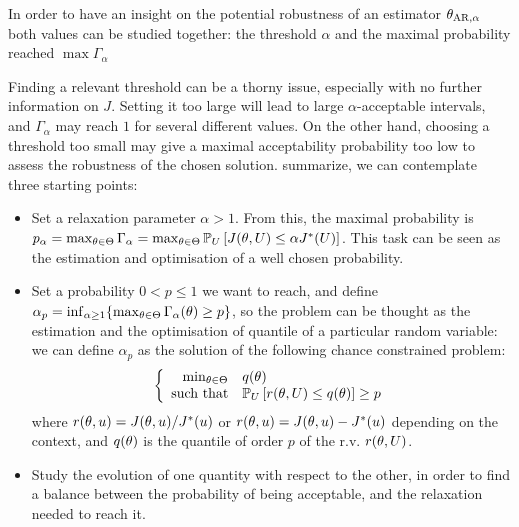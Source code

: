 \documentclass[../../Main_ManuscritThese.tex]{subfiles}
\begin{document}
In order to have an insight on the potential robustness of an
estimator ${\theta}_{\mathrm{AR,\alpha}}$ both values can be studied
together: the threshold $\alpha$ and the maximal probability reached
$\max \Gamma_\alpha$

  
  Finding a relevant threshold can be a thorny issue, especially with
  no further information on $J$. Setting it too large will lead to
  large $\alpha$-acceptable intervals, and $\Gamma_\alpha$ may reach
  $1$ for several different values. On the other hand, choosing a
  threshold too small may give a maximal acceptability probability too
  low to assess the robustness of the chosen solution.  summarize, we
  can contemplate three starting points:
 \begin{itemize}
 \item Set a relaxation parameter $\alpha > 1$. From this, the maximal
   probability is
   $p_{\alpha} = \max_{\theta\in\Theta} \Gamma_{\alpha} =
   \max_{\theta\in\Theta} \mathbb{P}_{U}\left[J(\theta, U) \leq \alpha
     J^*(U)\right]$. This task can be seen as the estimation and
   optimisation of a well chosen probability.

   
\item Set a probability $0< p\leq 1 $ we want to reach, and define
  $\alpha_p = \inf_{\alpha \geq 1}\{\max_{\theta \in
    \Theta}\Gamma_{\alpha}(\theta)\geq p \}$, so the problem can be
  thought as the estimation and the optimisation of quantile of a
  particular random variable: we can define $\alpha_p$ as the solution
  of the following chance constrained problem:
  \begin{equation}
    \label{eq:opt_alpha_p_formulation}
  \left\{
  \begin{array}{rl}
    \min_{\theta\in\Theta} &  q(\theta) \\
  \text{such that} & \mathbb{P}_{U}\left[r(\theta, U) \leq q(\theta) \right] \geq p
  \end{array}
  \right.
\end{equation}
where $r(\theta, u) = J(\theta, u)/J^*(u)$ or
$r(\theta, u)=J(\theta, u) - J^*(u)$ depending on the context, and
$q(\theta)$ is the quantile of order $p$ of the r.v. $r(\theta, U)$.



\item Study the evolution of one quantity with respect to the other,
  in order to find a balance between the probability of being
  acceptable, and the relaxation needed to reach it.
\end{itemize}
\end{document}
